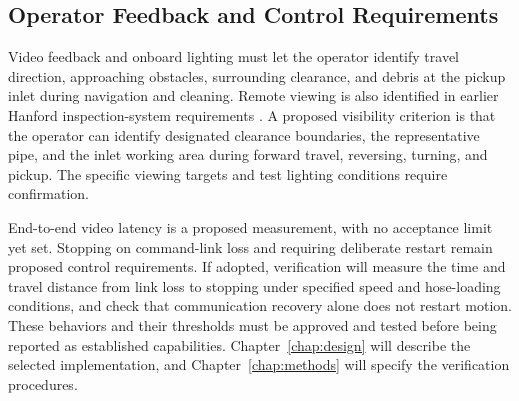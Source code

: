 \subsection{Operator Feedback and Control Requirements}
\label{sec:operator-requirements}
Video feedback and onboard lighting must let the operator identify travel direction, approaching obstacles, surrounding clearance, and debris at the pickup inlet during navigation and cleaning. Remote viewing is also identified in earlier Hanford inspection-system requirements \citep{pardini2001DSTRequirements}. A proposed visibility criterion is that the operator can identify designated clearance boundaries, the representative pipe, and the inlet working area during forward travel, reversing, turning, and pickup. The specific viewing targets and test lighting conditions require confirmation.

End-to-end video latency is a proposed measurement, with no acceptance limit yet set. Stopping on command-link loss and requiring deliberate restart remain proposed control requirements. If adopted, verification will measure the time and travel distance from link loss to stopping under specified speed and hose-loading conditions, and check that communication recovery alone does not restart motion. These behaviors and their thresholds must be approved and tested before being reported as established capabilities. Chapter~\ref{chap:design} will describe the selected implementation, and Chapter~\ref{chap:methods} will specify the verification procedures.
\par
\endgroup



